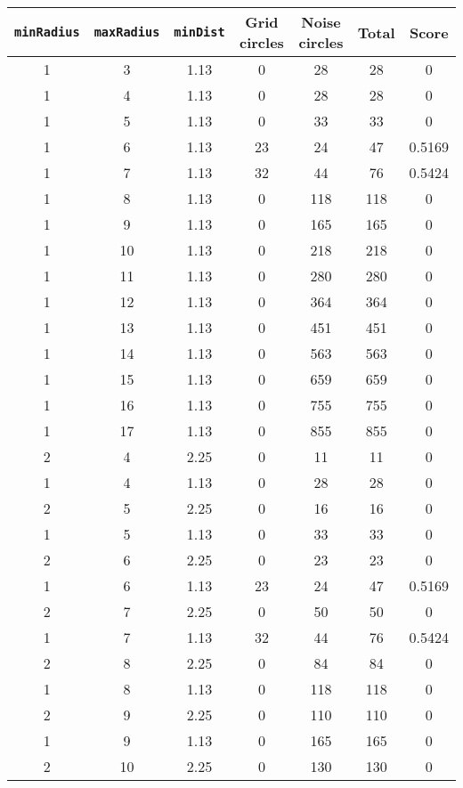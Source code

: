\documentclass[letterpaper, 12pt]{article}
\begin{document}
\begin{longtable}{|c|c|c|c|c|c|c|}
\hline
\textbf{\texttt{minRadius}} & \textbf{\texttt{maxRadius}} & \textbf{\texttt{minDist}} & \textbf{Grid circles} & \textbf{Noise circles} & \textbf{Total} & \textbf{Score} \\
\hline
1 & 3 & 1.13 & 0 & 28 & 28 & 0 \\
\hline
1 & 4 & 1.13 & 0 & 28 & 28 & 0 \\
\hline
1 & 5 & 1.13 & 0 & 33 & 33 & 0 \\
\hline
1 & 6 & 1.13 & 23 & 24 & 47 & 0.5169 \\
\hline
1 & 7 & 1.13 & 32 & 44 & 76 & 0.5424 \\
\hline
1 & 8 & 1.13 & 0 & 118 & 118 & 0 \\
\hline
1 & 9 & 1.13 & 0 & 165 & 165 & 0 \\
\hline
1 & 10 & 1.13 & 0 & 218 & 218 & 0 \\
\hline
1 & 11 & 1.13 & 0 & 280 & 280 & 0 \\
\hline
1 & 12 & 1.13 & 0 & 364 & 364 & 0 \\
\hline
1 & 13 & 1.13 & 0 & 451 & 451 & 0 \\
\hline
1 & 14 & 1.13 & 0 & 563 & 563 & 0 \\
\hline
1 & 15 & 1.13 & 0 & 659 & 659 & 0 \\
\hline
1 & 16 & 1.13 & 0 & 755 & 755 & 0 \\
\hline
1 & 17 & 1.13 & 0 & 855 & 855 & 0 \\
\hline
2 & 4 & 2.25 & 0 & 11 & 11 & 0 \\
\hline
1 & 4 & 1.13 & 0 & 28 & 28 & 0 \\
\hline
2 & 5 & 2.25 & 0 & 16 & 16 & 0 \\
\hline
1 & 5 & 1.13 & 0 & 33 & 33 & 0 \\
\hline
2 & 6 & 2.25 & 0 & 23 & 23 & 0 \\
\hline
1 & 6 & 1.13 & 23 & 24 & 47 & 0.5169 \\
\hline
2 & 7 & 2.25 & 0 & 50 & 50 & 0 \\
\hline
1 & 7 & 1.13 & 32 & 44 & 76 & 0.5424 \\
\hline
2 & 8 & 2.25 & 0 & 84 & 84 & 0 \\
\hline
1 & 8 & 1.13 & 0 & 118 & 118 & 0 \\
\hline
2 & 9 & 2.25 & 0 & 110 & 110 & 0 \\
\hline
1 & 9 & 1.13 & 0 & 165 & 165 & 0 \\
\hline
2 & 10 & 2.25 & 0 & 130 & 130 & 0 \\

\end{longtable}
\end{document}
